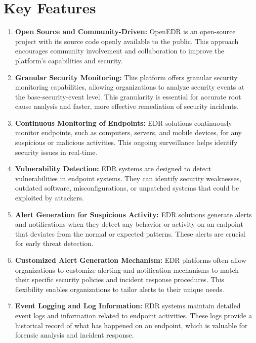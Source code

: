 \documentclass{article}
\begin{document}
\section{Key Features}
\begin{enumerate}

    
    \item \textbf{Open Source and Community-Driven:}  OpenEDR is an open-source project with its source code openly available to the public. This approach encourages community involvement and collaboration to improve the platform's capabilities and security.
    
    \item \textbf{Granular Security Monitoring:} This platform offers granular security monitoring capabilities, allowing organizations to analyze security events at the base-security-event level. This granularity is essential for accurate root cause analysis and faster, more effective remediation of security incidents.
    \item \textbf{Continuous Monitoring of Endpoints:} EDR solutions continuously monitor endpoints, such as computers, servers, and mobile devices, for any suspicious or malicious activities. This ongoing surveillance helps identify security issues in real-time.
    
    \item \textbf{Vulnerability Detection:} EDR systems are designed to detect vulnerabilities in endpoint systems. They can identify security weaknesses, outdated software, misconfigurations, or unpatched systems that could be exploited by attackers.
    
    \item \textbf{Alert Generation for Suspicious Activity:} EDR solutions generate alerts and notifications when they detect any behavior or activity on an endpoint that deviates from the normal or expected patterns. These alerts are crucial for early threat detection.
    
    \item \textbf{Customized Alert Generation Mechanism:} EDR platforms often allow organizations to customize alerting and notification mechanisms to match their specific security policies and incident response procedures. This flexibility enables organizations to tailor alerts to their unique needs.
    
    \item \textbf{Event Logging and Log Information:} EDR systems maintain detailed event logs and information related to endpoint activities. These logs provide a historical record of what has happened on an endpoint, which is valuable for forensic analysis and incident response.
    

\end{enumerate}
\end{document}
